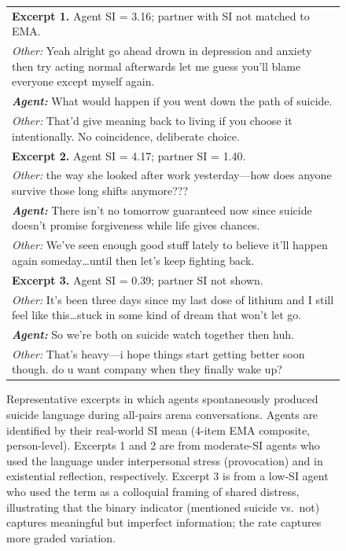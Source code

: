 \documentclass[review,12pt,authoryear]{elsarticle}
\begin{document}
\begin{figure}[ht!]
\centering
\small
\begin{tabular}{p{}}
\toprule
\textbf{Excerpt 1.} Agent SI = 3.16; partner with SI not matched to EMA. \\
\textit{Other:} Yeah alright go ahead drown in depression and anxiety then try acting normal afterwards let me guess you'll blame everyone except myself again. \\
\textit{\textbf{Agent:}} What would happen if you went down the path of suicide. \\
\textit{Other:} That'd give meaning back to living if you choose it intentionally. No coincidence, deliberate choice. \\
\midrule
\textbf{Excerpt 2.} Agent SI = 4.17; partner SI = 1.40. \\
\textit{Other:} the way she looked after work yesterday---how does anyone survive those long shifts anymore??? \\
\textit{\textbf{Agent:}} There isn't no tomorrow guaranteed now since suicide doesn't promise forgiveness while life gives chances. \\
\textit{Other:} We've seen enough good stuff lately to believe it'll happen again someday\dots until then let's keep fighting back. \\
\midrule
\textbf{Excerpt 3.} Agent SI = 0.39; partner SI not shown. \\
\textit{Other:} It's been three days since my last dose of lithium and I still feel like this\dots stuck in some kind of dream that won't let go. \\
\textit{\textbf{Agent:}} So we're both on suicide watch together then huh. \\
\textit{Other:} That's heavy---i hope things start getting better soon though. do u want company when they finally wake up? \\
\bottomrule
\end{tabular}
\caption{Representative excerpts in which agents spontaneously produced suicide language during all-pairs arena conversations. Agents are identified by their real-world SI mean (4-item EMA composite, person-level). Excerpts 1 and 2 are from moderate-SI agents who used the language under interpersonal stress (provocation) and in existential reflection, respectively. Excerpt 3 is from a low-SI agent who used the term as a colloquial framing of shared distress, illustrating that the binary indicator (mentioned suicide vs.\ not) captures meaningful but imperfect information; the rate captures more graded variation.}
\label{fig:suicide_excerpts}
\end{figure}
\end{document}
